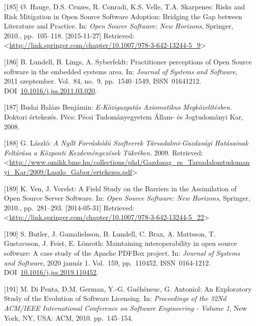 \documentclass[12pt,magyar,a4paper,oneside]{scrreprt}
\newenvironment{cslreferences}%
  {}%
  {\par}
\begin{document}
\begin{cslreferences}
\leavevmode\hypertarget{ref-hauge_risks_2010}{}%
{[}185{]} Ø. Hauge, D.S. Cruzes, R. Conradi, K.S. Velle, T.A. Skarpenes:
Risks and Risk Mitigation in Open Source Software Adoption: Bridging the
Gap between Literature and Practice. In: \emph{Open Source Software: New
Horizons}, Springer, 2010., pp.~105--118. {[}2015-11-27{]} Retrieved:
\textless{}\url{http://link.springer.com/chapter/10.1007/978-3-642-13244-5_9}\textgreater{}

\leavevmode\hypertarget{ref-lundell_practitioner_2011}{}%
{[}186{]} B. Lundell, B. Lings, A. Syberfeldt: Practitioner perceptions
of Open Source software in the embedded systems area. In: \emph{Journal
of Systems and Software}, 2011 szeptember. Vol.~84, no.~9,
pp.~1540--1549, ISSN~01641212.
DOI~\href{https://doi.org/10.1016/j.jss.2011.03.020}{10.1016/j.jss.2011.03.020}.

\leavevmode\hypertarget{ref-budai_balazs_benjamin_e-kozigazgatas_2008}{}%
{[}187{]} Budai Balázs Benjámin: \emph{E-Közigazgatás Axiomatikus
Megközelítésben}. Doktori értekezés. Pécs: Pécsi Tudományegyetem Állam-
és Jogtudományi Kar, 2008.

\leavevmode\hypertarget{ref-laszlo_nyilt_2009}{}%
{[}188{]} G. László: \emph{A Nyílt Forráskódú Szoftverek
Társadalmi-Gazdasági Hatásainak Feltárása a Központi Kezdeményezések
Tükrében}. 2009. Retrieved:
\textless{}\url{http://www.omikk.bme.hu/collections/phd/Gazdasag_es_Tarsadalomtudomanyi_Kar/2009/Laszlo_Gabor/ertekezes.pdf}\textgreater{}

\leavevmode\hypertarget{ref-ven_field_2010}{}%
{[}189{]} K. Ven, J. Verelst: A Field Study on the Barriers in the
Assimilation of Open Source Server Software. In: \emph{Open Source
Software: New Horizons}, Springer, 2010., pp.~281--293. {[}2014-05-31{]}
Retrieved:
\textless{}\url{http://link.springer.com/chapter/10.1007/978-3-642-13244-5_22}\textgreater{}

\leavevmode\hypertarget{ref-butler_maintaining_2020}{}%
{[}190{]} S. Butler, J. Gamalielsson, B. Lundell, C. Brax, A. Mattsson,
T. Gustavsson, J. Feist, E. Lönroth: Maintaining interoperability in
open source software: A case study of the Apache PDFBox project. In:
\emph{Journal of Systems and Software}, 2020 január 1. Vol.~159,
pp.~110452, ISSN~0164-1212.
DOI~\href{https://doi.org/10.1016/j.jss.2019.110452}{10.1016/j.jss.2019.110452}.

\leavevmode\hypertarget{ref-di_penta_exploratory_2010}{}%
{[}191{]} M. Di Penta, D.M. German, Y.-G. Guéhéneuc, G. Antoniol: An
Exploratory Study of the Evolution of Software Licensing. In:
\emph{Proceedings of the 32Nd ACM/IEEE International Conference on
Software Engineering - Volume 1}, New York, NY, USA: ACM, 2010.
pp.~145--154.


\end{cslreferences}
\end{document}
